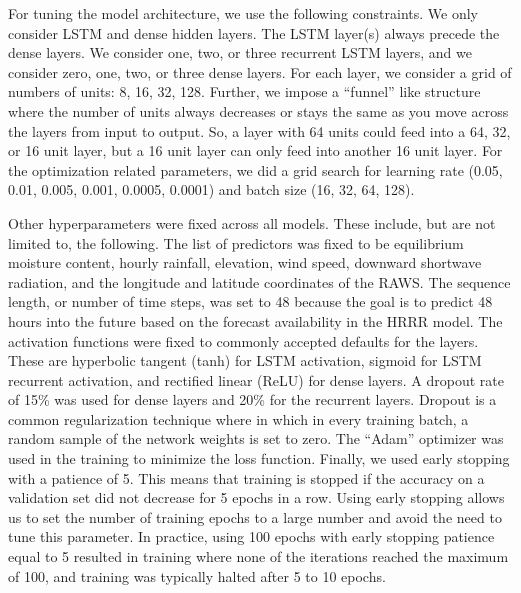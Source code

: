 \documentclass[fire,article,submit,pdftex,moreauthors]{Definitions/mdpi}
\begin{document}
For tuning the model architecture, we use the following constraints. We only consider LSTM and dense hidden layers. The LSTM layer(s) always precede the dense layers. We consider one, two, or three recurrent LSTM layers, and we consider zero, one, two, or three dense layers. For each layer, we consider a grid of numbers of units: 8, 16, 32, 128. Further, we impose a ``funnel'' like structure where the number of units always decreases or stays the same as you move across the layers from input to output. So, a layer with 64 units could feed into a 64, 32, or 16 unit layer, but a 16 unit layer can only feed into another 16 unit layer. For the optimization related parameters, we did a grid search for learning rate (0.05, 0.01, 0.005, 0.001, 0.0005, 0.0001) and batch size (16, 32, 64, 128). 

Other hyperparameters were fixed across all models. These include, but are not limited to, the following. The list of predictors was fixed to be equilibrium moisture content, hourly rainfall, elevation, wind speed, downward shortwave radiation, and the longitude and latitude coordinates of the RAWS. The sequence length, or number of time steps, was set to 48 because the goal is to predict 48 hours into the future based on the forecast availability in the HRRR model. The activation functions were fixed to commonly accepted defaults for the layers. These are hyperbolic tangent (tanh) for LSTM activation, sigmoid for LSTM recurrent activation, and rectified linear (ReLU) for dense layers. A dropout rate of 15\% was used for dense layers and 20\% for the recurrent layers. Dropout is a common regularization technique where in which in every training batch, a random sample of the network weights is set to zero. The ``Adam'' optimizer was used in the training to minimize the loss function. Finally, we used early stopping with a patience of 5. This means that training is stopped if the accuracy on a validation set did not decrease for 5 epochs in a row. Using early stopping allows us to set the number of training epochs to a large number and avoid the need to tune this parameter. In practice, using 100 epochs with early stopping patience equal to 5 resulted in training where none of the iterations reached the maximum of 100, and training was typically halted after 5 to 10 epochs. 

\end{document}
